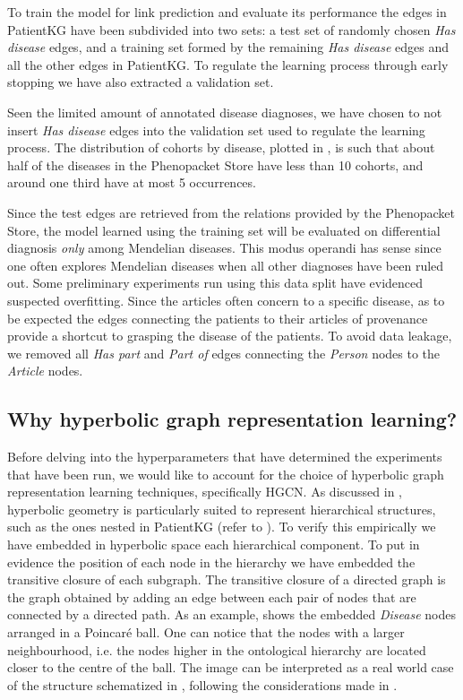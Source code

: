 To train the model for link prediction and evaluate its performance the edges in PatientKG have been subdivided into two sets: a test set of randomly chosen \emph{Has disease} edges, and a training set formed by the remaining \emph{Has disease} edges and all the other edges in PatientKG. To regulate the learning process through early stopping we have also extracted a validation set.

Seen the limited amount of annotated disease diagnoses, we have chosen to not insert \emph{Has disease} edges into the validation set used to regulate the learning process. The distribution of cohorts by disease, plotted in , is such that about half of the diseases in the Phenopacket Store have less than 10 cohorts, and around one third have at most 5 occurrences.

Since the test edges are retrieved from the relations provided by the Phenopacket Store, the model learned using the training set will be evaluated on differential diagnosis \emph{only} among Mendelian diseases. This modus operandi has sense since one often explores Mendelian diseases when all other diagnoses have been ruled out. 
Some preliminary experiments run using this data split have evidenced suspected overfitting. Since the articles often concern to a specific disease, as to be expected the edges connecting the patients to their articles of provenance provide a shortcut to grasping the disease of the patients. To avoid data leakage, we removed all \emph{Has part} and \emph{Part of} edges connecting the \emph{Person} nodes to the \emph{Article} nodes. 

\subsection{Why hyperbolic graph representation learning?}\label{sec:hypPatientKG}
Before delving into the hyperparameters that have determined the experiments that have been run, we would like to account for the choice of hyperbolic graph representation learning techniques, specifically HGCN. As discussed in , hyperbolic geometry is particularly suited to represent hierarchical structures, such as the ones nested in PatientKG (refer to ). To verify this empirically we have embedded in hyperbolic space each hierarchical component. To put in evidence the position of each node in the hierarchy we have embedded the transitive closure of each subgraph. The transitive closure of a directed graph is the graph obtained by adding an edge between each pair of nodes that are connected by a directed path. As an example,  shows the embedded \emph{Disease} nodes arranged in a Poincaré ball. One can notice that the nodes with a larger neighbourhood, i.e. the nodes higher in the ontological hierarchy are located closer to the centre of the ball. The image can be interpreted as a real world case of the structure schematized in , following the considerations made in . 


